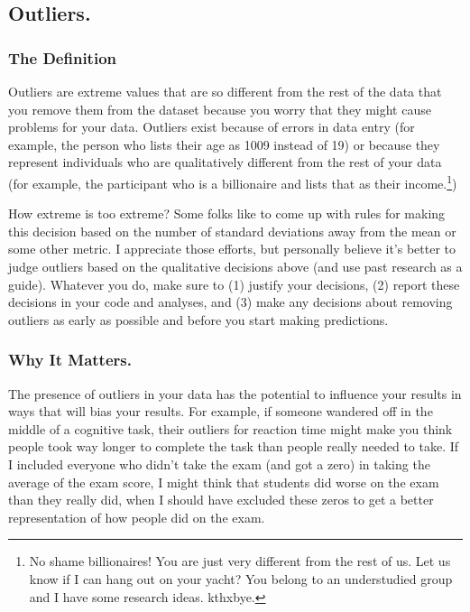 \documentclass[
  letterpaper,
  DIV=11,
  numbers=noendperiod,
  oneside]{scrreprt}
\begin{document}
\subsection{Outliers.}\label{outliers.}

\subsubsection{The Definition}\label{the-definition-2}

Outliers are extreme values that are so different from the rest of the
data that you remove them from the dataset because you worry that they
might cause problems for your data. Outliers exist because of errors in
data entry (for example, the person who lists their age as 1009 instead
of 19) or because they represent individuals who are qualitatively
different from the rest of your data (for example, the participant who
is a billionaire and lists that as their income.\footnote{No shame
  billionaires! You are just very different from the rest of us. Let us
  know if I can hang out on your yacht? You belong to an understudied
  group and I have some research ideas. kthxbye.})

How extreme is too extreme? Some folks like to come up with rules for
making this decision based on the number of standard deviations away
from the mean or some other metric. I appreciate those efforts, but
personally believe it's better to judge outliers based on the
qualitative decisions above (and use past research as a guide). Whatever
you do, make sure to (1) justify your decisions, (2) report these
decisions in your code and analyses, and (3) make any decisions about
removing outliers as early as possible and before you start making
predictions.

\subsubsection{Why It Matters.}\label{why-it-matters.-2}

The presence of outliers in your data has the potential to influence
your results in ways that will bias your results. For example, if
someone wandered off in the middle of a cognitive task, their outliers
for reaction time might make you think people took way longer to
complete the task than people really needed to take. If I included
everyone who didn't take the exam (and got a zero) in taking the average
of the exam score, I might think that students did worse on the exam
than they really did, when I should have excluded these zeros to get a
better representation of how people did on the exam.
\end{document}
